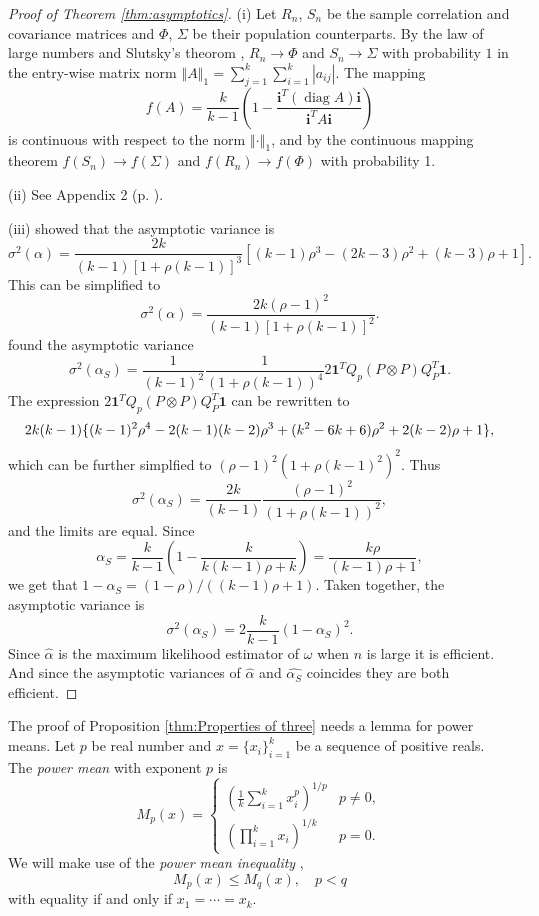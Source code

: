 \documentclass[twoside]{article}
\DeclareMathOperator{\diag}{diag}
\DeclareMathOperator{\tsum}{\textstyle \sum}
\begin{document}
\begin{proof}[Proof of Theorem \ref{thm:asymptotics}]\label{proof:asymptotics}
(i) Let $R_{n}$, $S_{n}$ be the sample correlation and covariance matrices
and $\Phi$, $\Sigma$ be their population counterparts. By the law
of large numbers and Slutsky's theorom \citep[][Lemma 2.8, p. 11]{Van_der_Vaart2000-qc}, $R_{n}\to\Phi$ and $S_{n}\to\Sigma$
with probability $1$ in the entry-wise matrix norm $\left\Vert A\right\Vert _{1}=\tsum_{j=1}^{k}\tsum_{i=1}^{k}\left|a_{ij}\right|$.
The mapping
\[
f(A)=\frac{k}{k-1}\left(1-\frac{\mathbf{i}^{T}(\diag A)\mathbf{i}}{\mathbf{i}^{T}A\mathbf{i}}\right)
\]
is continuous with respect to the norm $\left\Vert \cdot\right\Vert _{1}$,
and by the continuous mapping theorem \citep[][Theorem 2.3, p. 7]{Van_der_Vaart2000-qc}
$f(S_{n})\to f(\Sigma)$ and $f(R_{n})\to f(\Phi)$
with probability 1.

(ii) See Appendix 2 (p. \pageref{appendix 2}).

(iii) \citet[eq. 22]{Van_Zyl2000-si} showed that the asymptotic variance
is
\[
\sigma^{2}(\alpha)=\frac{2k}{(k-1)[1+\rho(k-1)]^{3}}[(k-1)\rho^{3}-(2k-3)\rho^{2}+(k-3)\rho+1].
\]
This can be simplified to
\[
\sigma^{2}(\alpha)=\frac{2k(\rho-1)^{2}}{(k-1)[1+\rho(k-1)]^{2}}.
\]
\citet[equation 10]{hayashi2005note} found the asymptotic variance
\[
\sigma^{2}(\alpha_S)=\frac{1}{(k-1)^{2}}\frac{1}{(1+\rho(k-1))^{4}}2\mathbf{1}^{T}Q_{p}(P\otimes P)Q_{P}^{T}\mathbf{1}.
\]
The expression $2\mathbf{1}^{T}Q_{p}(P\otimes P)Q_{P}^{T}\mathbf{1}$
can be rewritten to \citep[appendix 3]{hayashi2005note}
\[
2k(k-1)\{ (k-1)^{2}\rho^{4}-2(k-1)(k-2)\rho^{3}+(k^{2}-6k+6)\text{\ensuremath{\rho^{2}+2(k-2)\rho+1}}\},
\]
which can be further simplfied to $(\rho-1)^{2}(1+\rho(k-1)^{2})^{2}$.
Thus
\[
\sigma^{2}(\alpha_S)=\frac{2k}{(k-1)}\frac{(\rho-1)^{2}}{(1+\rho(k-1))^{2}},
\]
and the limits are equal.
Since
\begin{equation*}
\alpha_S = \frac{k}{k-1}\left(1-\frac{k}{k(k-1)\rho+k}\right) = \frac{k\rho}{(k-1)\rho+1},
\end{equation*}
we get that $1-\alpha_S = (1-\rho)/((k-1)\rho+1)$. Taken together, the asymptotic variance is
\[
\sigma^{2}(\alpha_S)=2\frac{k}{k-1}(1-\alpha_S)^{2}.
\]
Since $\hat{\alpha}$ is the maximum likelihood estimator of $\omega$
when $n$ is large it is efficient. And since the asymptotic variances
of $\hat{\alpha}$ and $\hat{\alpha_S}$ coincides they
are both efficient.
\end{proof}

The proof of Proposition \ref{thm:Properties of three} needs a lemma for power means. Let $p$ be real number and $x=\{x_{i}\} _{i=1}^{k}$ be a sequence
of positive reals. The \textit{power mean} with exponent $p$ is
\[
M_{p}(x)=\begin{cases}
(\frac{1}{k}\tsum_{i=1}^{k}x_{i}^{p})^{1/p} & p\neq0,\\
(\prod_{i=1}^{k}x_{i})^{1/k} & p=0.
\end{cases}
\]
We will make use of the \textit{power mean inequality} \citep[][Chapter III]{Bullen2013-os},
\begin{equation}
M_{p}(x)\leq M_{q}(x),\quad p<q\label{eq:generalized mean inequality}
\end{equation}
with equality if and only if $x_{1}=\cdots=x_{k}$. 
\end{document}
